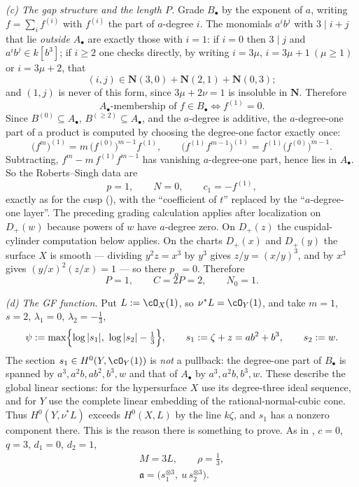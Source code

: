 \begin{example}
\emph{(c) The gap structure and the length $P$.}  Grade $B_\bullet$ by
the exponent of $a$, writing $f=\sum_if^{(i)}$ with $f^{(i)}$ the part
of $a$-degree $i$.  The monomials $a^ib^j$ with $3\mid i+j$ that lie
\emph{outside} $A_\bullet$ are exactly those with $i=1$: if $i=0$ then
$3\mid j$ and $a^ib^j\in k[b^3]$; if $i\ge2$ one checks directly, by
writing $i=3\mu$, $i=3\mu+1\ (\mu\ge1)$ or $i=3\mu+2$, that
\[
 (i,j)\in\mathbf N(3,0)+\mathbf N(2,1)+\mathbf N(0,3);
\]
and $(1,j)$ is never of this form, since $3\mu+2\nu=1$ is insoluble in
$\mathbf N$.  Therefore
\[
 A_\bullet\text{-membership of }f\in B_\bullet
 \iff f^{(1)}=0 .
\]
Since $B^{(0)}\subseteq A_\bullet$, $B^{(\ge2)}\subseteq A_\bullet$, and
the $a$-degree is additive, the $a$-degree-one part of a product is
computed by choosing the degree-one factor exactly once:
\[
 \bigl(f^m\bigr)^{(1)}=m\,\bigl(f^{(0)}\bigr)^{m-1}f^{(1)},
 \qquad
 \bigl(f^{(1)}f^{m-1}\bigr)^{(1)}=f^{(1)}\bigl(f^{(0)}\bigr)^{m-1}.
\]
Subtracting, $f^m-m\,f^{(1)}f^{m-1}$ has vanishing $a$-degree-one part,
hence lies in $A_\bullet$.  So the Roberts--Singh data are
\[
 p=1,\qquad N=0,\qquad c_1=-f^{(1)},
\]
exactly as for the cusp (), with the ``coefficient of
$t$'' replaced by the ``$a$-degree-one layer''.  The preceding grading calculation applies after localization on
$D_+(w)$ because powers of $w$ have $a$-degree zero.
On $D_+(z)$ the cuspidal-cylinder computation below applies.
On the charts $D_+(x)$ and $D_+(y)$ the surface $X$ is smooth --- dividing
$y^2z=x^3$ by $y^3$ gives $z/y=(x/y)^3$, and by $x^3$ gives
$(y/x)^2(z/x)=1$ --- so there $p_\alpha=0$.  Therefore
\[
 P=1,\qquad C=2P=2,\qquad N_0=1 .
\]

\emph{(d) The GF function.}  Put $L:=\cO_X(1)$, so $\nu^*L=\cO_Y(1)$,
and take $m=1$, $s=2$, $\lambda_1=0$, $\lambda_2=-\tfrac13$,
\[
 \psi:=\max\Bigl\{\log|s_1|,\ \log|s_2|-\tfrac13\Bigr\},
 \qquad
 s_1:=\zeta+z=ab^2+b^3,
 \qquad
 s_2:=w .
\]
The section $s_1\in H^0(Y,\cO_Y(1))$ is \emph{not} a pullback: the
degree-one part of $B_\bullet$ is spanned by $a^3,a^2b,ab^2,b^3,w$ and
that of $A_\bullet$ by $a^3,a^2b,b^3,w$.
These describe the global linear sections: for the hypersurface $X$
use its degree-three ideal sequence, and for $Y$ use the complete
linear embedding of the rational-normal-cubic cone.
Thus $H^0(Y,\nu^*L)$ exceeds $H^0(X,L)$ by the line $k\zeta$, and
$s_1$ has a nonzero component there.  This is
the reason there is something to prove.  As in
, $c=0$, $q=3$, $d_1=0$, $d_2=1$,
\[
 \begin{gathered}
 M=3L,\qquad \rho=\tfrac13,\\
 \mathfrak a
 =\bigl(s_1^{\otimes3},\ u\,s_2^{\otimes3}\bigr).
 \end{gathered}
\]


\end{example}
